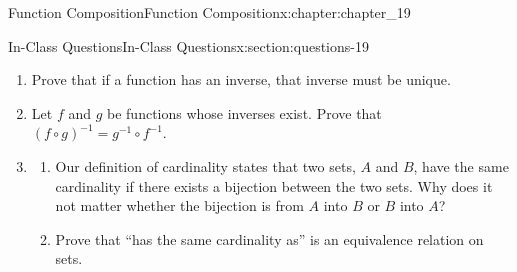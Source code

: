 \documentclass[oneside,10pt,]{book}
\numberwithin{equation}{section}
\begin{document}
\begin{chapterptx}{Function Composition}{}{Function Composition}{}{}{x:chapter:chapter_19}
\begin{sectionptx}{In-Class Questions}{}{In-Class Questions}{}{}{x:section:questions-19}
\begin{enumerate}[label=\arabic*.]
\item{}Prove that if a function has an inverse, that inverse must be unique.%
\item{}Let \(f\) and \(g\) be functions whose inverses exist. Prove that \((f\circ g)^{-1}= g^{-1}\circ f^{-1}\).%
\item{}%
\begin{enumerate}[label=(\alph*)]
\item{}Our definition of cardinality states that two sets, \(A\) and \(B\), have the same cardinality if there exists a bijection between the two sets. Why does it not matter whether the bijection is from \(A\) into \(B\) or \(B\) into \(A\)?%
\item{}Prove that ``has the same cardinality as'' is an equivalence relation on sets.%
\end{enumerate}
%
\end{enumerate}
%
\end{sectionptx}
\end{chapterptx}
%
%
\typeout{************************************************}
\typeout{************************************************}
%
\end{document}
